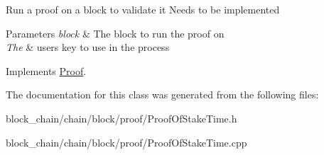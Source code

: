 Run a proof on a block to validate it Needs to be implemented


\begin{DoxyParams}{Parameters}
{\em block} & The block to run the proof on \\
\hline
{\em The} & user\textquotesingle{}s key to use in the process \\
\hline
\end{DoxyParams}


Implements \mbox{\hyperlink{classProof_a8a43fcb7c997da54d627e0f257adb86f}{Proof}}.



The documentation for this class was generated from the following files\+:\begin{DoxyCompactItemize}
\item 
block\+\_\+chain/chain/block/proof/Proof\+Of\+Stake\+Time.\+h\item 
block\+\_\+chain/chain/block/proof/Proof\+Of\+Stake\+Time.\+cpp\end{DoxyCompactItemize}
